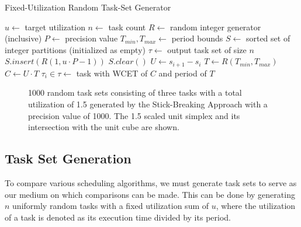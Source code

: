 \documentclass[conference,compsoc]{IEEEtran}
\begin{document}
\begin{algorithm}
\caption{Fixed-Utilization Random Task-Set Generator}\label{rtset_alg}
\begin{algorithmic}
\State $u \gets$ target utilization
\State $n \gets$ task count
\State $R \gets$ random integer generator (inclusive)
\State $P \gets$ precision value
\State $T_{min}, T_{max} \gets$ period bounds
\State $S \gets$ sorted set of integer partitions (initialized as empty)
\State $\tau \gets$ output task set of size $n$
    \State $S.insert(R(1, u \cdot P - 1))$
        \State $S.clear()$
    \EndIf
\EndWhile
{}
    \State $U \gets s_{i+1} - s_i$
    \State $T \gets R(T_{min}, T_{max})$
    \State $C \gets U \cdot T$
    \State $\tau_i \in \tau \gets$ task with WCET of $C$ and period of $T$
\EndFor
\end{algorithmic}
\end{algorithm}
\begin{figure}
\caption{1000 random task sets consisting of three tasks with a total utilization of 1.5 generated by the Stick-Breaking Approach with a precision value of 1000. The 1.5 scaled unit simplex and its intersection with the unit cube are shown.}
\label{fig_stickbreak}
\end{figure}
\subsection{Task Set Generation}
To compare various scheduling algorithms, we must generate task sets to serve as our medium on which comparisons can be made. This can be done by generating $n$ uniformly random tasks with a fixed utilization sum of $u$, where the utilization of a task is denoted as its execution time divided by its period.
\end{document}
